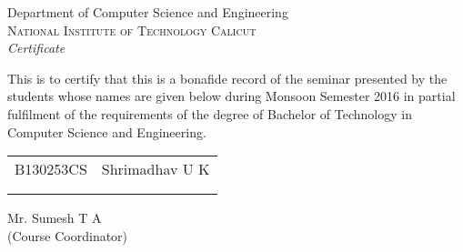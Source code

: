 \newpage
\thispagestyle{empty}

\begin{center}

\huge{Department of Computer Science and Engineering}\\[0.5cm]
\normalsize
\textsc{National Institute of Technology Calicut}\\[2.0cm]

\emph{\LARGE Certificate}\\[2.5cm]
\end{center}
\normalsize This is to certify that this is a bonafide record of the seminar presented by the students whose names are given below during Monsoon Semester 2016 in partial fulfilment of the requirements of the degree of Bachelor of Technology in Computer Science and Engineering.\\[1.0cm]

\begin{table}[h]
\centering
\begin{tabular}{lr}
B130253CS & Shrimadhav U K \\ \\ \hline
\\
\end{tabular}
\end{table}

\vfill


\begin{flushright}
Mr. Sumesh T A\\
(Course Coordinator)\\
\end{flushright}

